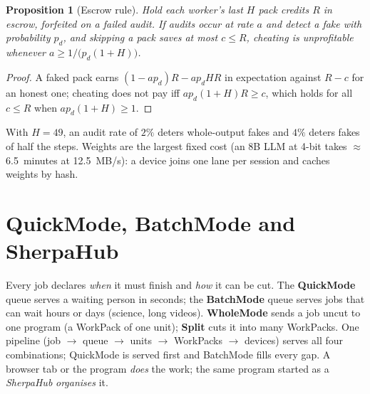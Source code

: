 \documentclass[11pt,a4paper]{article}
\theoremstyle{definition}
\theoremstyle{plain}
\newtheorem{proposition}{Proposition}[section]
\begin{document}
\begin{proposition}[Escrow rule]\label{prop:escrow}
Hold each worker's last $H$ pack credits $R$ in escrow, forfeited on a failed audit. If audits occur at rate
$a$ and detect a fake with probability $p_d$, and skipping a pack saves at most $c\le R$, cheating is
unprofitable whenever $a\ge 1/\big(p_d(1+H)\big)$.
\end{proposition}
\begin{proof}
A faked pack earns $(1-ap_d)R-ap_dHR$ in expectation against $R-c$ for an honest one; cheating does not pay
iff $ap_d(1+H)R\ge c$, which holds for all $c\le R$ when $ap_d(1+H)\ge1$.
\end{proof}

\noindent With $H=49$, an audit rate of $2\%$ deters whole-output fakes and $4\%$ deters fakes of half the
steps. Weights are the largest fixed cost (an 8B LLM at 4-bit takes $\approx$6.5~minutes at 12.5~MB/s): a device joins
one lane per session and caches weights by hash.

\section{QuickMode, BatchMode and SherpaHub}\label{sec:batchmode}

Every job declares \emph{when} it must finish and \emph{how} it can be cut. The \textbf{QuickMode} queue
serves a waiting person in seconds; the \textbf{BatchMode} queue serves jobs that can wait hours or days
(science, long videos). \textbf{WholeMode} sends a job uncut to one program (a WorkPack of one unit);
\textbf{Split} cuts it into many WorkPacks. One pipeline (job $\rightarrow$ queue $\rightarrow$ units $\rightarrow$ WorkPacks $\rightarrow$ devices) serves
all four combinations; QuickMode is served first and BatchMode fills every gap. A browser tab or the program
\emph{does} the work; the same program started as a \emph{SherpaHub} \emph{organises} it.
\end{document}

